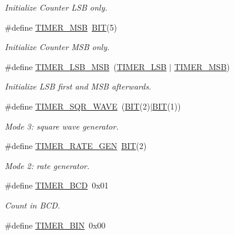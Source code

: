 \begin{DoxyCompactItemize}
\begin{DoxyCompactList}\small\item\em Initialize Counter L\+S\+B only. \end{DoxyCompactList}\item 
\#define \hyperlink{group__i8254_ga2a8a6d363c612d756cd8d78480f7cd04}{T\+I\+M\+E\+R\+\_\+\+M\+S\+B}~\hyperlink{group__i8254_ga3a8ea58898cb58fc96013383d39f482c}{B\+I\+T}(5)
\begin{DoxyCompactList}\small\item\em Initialize Counter M\+S\+B only. \end{DoxyCompactList}\item 
\#define \hyperlink{group__i8254_ga8c0f1933323274c765e23837e4fbc8c7}{T\+I\+M\+E\+R\+\_\+\+L\+S\+B\+\_\+\+M\+S\+B}~(\hyperlink{group__i8254_gac18cb814ebd0d67235392c330e0e3504}{T\+I\+M\+E\+R\+\_\+\+L\+S\+B} $\vert$ \hyperlink{group__i8254_ga2a8a6d363c612d756cd8d78480f7cd04}{T\+I\+M\+E\+R\+\_\+\+M\+S\+B})
\begin{DoxyCompactList}\small\item\em Initialize L\+S\+B first and M\+S\+B afterwards. \end{DoxyCompactList}\item 
\#define \hyperlink{group__i8254_ga4745cbf21da3d3fea5dbb080b2b73bac}{T\+I\+M\+E\+R\+\_\+\+S\+Q\+R\+\_\+\+W\+A\+V\+E}~(\hyperlink{group__i8254_ga3a8ea58898cb58fc96013383d39f482c}{B\+I\+T}(2)$\vert$\hyperlink{group__i8254_ga3a8ea58898cb58fc96013383d39f482c}{B\+I\+T}(1))
\begin{DoxyCompactList}\small\item\em Mode 3\+: square wave generator. \end{DoxyCompactList}\item 
\#define \hyperlink{group__i8254_ga5d4449e0fa1cf4a4d107a48a04a1265f}{T\+I\+M\+E\+R\+\_\+\+R\+A\+T\+E\+\_\+\+G\+E\+N}~\hyperlink{group__i8254_ga3a8ea58898cb58fc96013383d39f482c}{B\+I\+T}(2)
\begin{DoxyCompactList}\small\item\em Mode 2\+: rate generator. \end{DoxyCompactList}\item 
\#define \hyperlink{group__i8254_ga325b992a371d5d981c4eceff42fa5956}{T\+I\+M\+E\+R\+\_\+\+B\+C\+D}~0x01
\begin{DoxyCompactList}\small\item\em Count in B\+C\+D. \end{DoxyCompactList}\item 
\#define \hyperlink{group__i8254_gad2913dcf2f91453317bd035589ac0a7d}{T\+I\+M\+E\+R\+\_\+\+B\+I\+N}~0x00

\end{DoxyCompactItemize}
